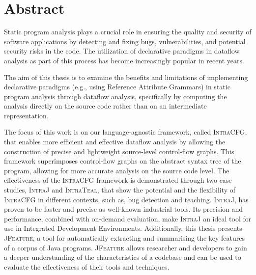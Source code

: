 \chapter{Abstract}


Static program analysis plays a crucial role in ensuring the quality and security of
software applications by detecting and fixing bugs, vulnerabilities,
and potential security risks in the code. The utilization of declarative paradigms
in dataflow analysis as part of this process has become increasingly popular in recent years.

The aim of this thesis is to examine the benefits and limitations of implementing
declarative paradigms (e.g., using Reference Attribute Grammars)  in static program analysis through dataflow analysis, specifically
by computing the analysis directly on the source code rather than on an intermediate representation.

The focus of this work is on our language-agnostic framework, called \textsc{IntraCFG},
that enables more efficient and effective dataflow analysis by allowing the  construction of precise and
lightweight source-level control-flow graphs. This framework superimposes control-flow
graphs on the abstract syntax tree of the program, allowing for more accurate analysis
on the source code level. The effectiveness of the \textsc{IntraCFG} framework is
demonstrated through two case studies, \textsc{IntraJ} and \textsc{IntraTeal}, that
show the potential and the flexibility of \textsc{IntraCFG} in different contexts,
such as, bug detection and teaching.
\textsc{IntraJ}, has proven to be faster and precise as well-known
industrial tools. Its precision and performance, combined with
on-demand evaluation, make \textsc{IntraJ} an ideal tool for use in
Integrated Development Environments.
Additionally, this thesis presents \textsc{JFeature}, a tool for automatically extracting
and summarising the key features of a corpus of Java programs. \textsc{JFeature} allows
researcher and developers to gain a deeper understanding of the characteristics of a codebase and
can be used to evaluate the effectiveness of their tools and techniques.
